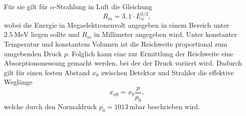 Für sie gilt für $\alpha$-Strahlung in Luft die Gleichung
\begin{equation}
  R_m = 3,1 \cdot E_{\alpha}^{3/2},
\end{equation}
wobei die Energie in Megaelektronenvolt angegeben in einem Bereich unter $\SI{2,5}{\mega\electronvolt}$ liegen sollte und $R_m$ in Millimeter angegeben wird.
Unter konstanter Temperatur und konstantem Volumen ist die Reichweite proportional zum umgebenden Druck $p$.
Folglich kann eine zur Ermittlung der Reichweite eine Absorptionsmessung gemacht werden, bei der der Druck variiert wird.
Dadurch gilt für einen festen Abstand $x_0$ zwischen Detektor und Strahler die effektive Weglänge
\begin{equation}
  x_{\text{eff}} = x_0 \frac{p}{p_0},
\end{equation}
welche durch den Normaldruck $p_0 = \SI{1013}{\milli\bar}$ beschrieben wird. \cite{sample}

